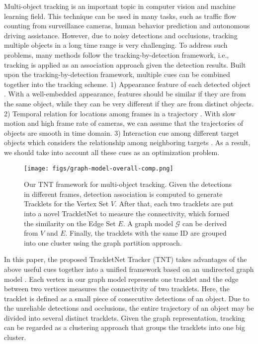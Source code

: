 \documentclass[10pt,twocolumn,letterpaper]{article}
\begin{document}
Multi-object tracking is an important topic in computer vision and machine learning field. This technique can be used in many tasks, such as traffic flow counting from surveillance cameras, human behavior prediction and autonomous driving assistance. 
However, due to noisy detections and occlusions, tracking multiple objects in a long time range is very challenging. To address such problems, many methods follow the tracking-by-detection framework, i.e., tracking is applied as an association approach given the detection results.
Built upon the tracking-by-detection framework, multiple cues can be combined together into the tracking scheme. 1) Appearance feature of each detected object \cite{ristani2018features,zhang2017multi,tang2017multiple,wojke2017simple}. With a well-embedded appearance, features should be similar if they are from the same object, while they can be very different if they are from distinct objects.
2) Temporal relation for locations among frames in a trajectory \cite{milan2017online}. With slow motion and high frame rate of cameras, we can assume that the trajectories of objects 
are smooth in time domain. 
3) Interaction cue among different target objects which considers the relationship among neighboring targets 
\cite{sadeghian2017tracking}. 
As a result, we should take into account all these cues as an optimization problem. 

\begin{figure}[t]
\begin{center}
\texttt{[image: figs/graph-model-overall-comp.png]}
\end{center}
   \caption{Our TNT framework for multi-object tracking. Given the detections in different frames, detection association is computed to generate Tracklets for the Vertex Set $V$. After that, each two tracklets are put into a novel TrackletNet to measure the connectivity, which formed the similarity on the Edge Set $E$. A graph model $\mathcal{G}$ can be derived from $V$ and $E$. Finally, the tracklets with the same ID are grouped into one cluster using the graph partition approach. }
\label{fig:overall-flow}
\end{figure}

In this paper, the proposed TrackletNet Tracker (TNT) takes advantages of the above useful cues together into a unified framework based on an undirected graph model \cite{milan2016multi}. Each vertex in our graph model represents one tracklet and the edge between two vertices measures the connectivity
of two tracklets. Here, the tracklet is defined as a small piece of consecutive detections of an object. Due to the unreliable detections and occlusions, the entire trajectory of an object may be divided into several distinct tracklets.
Given the graph representation, tracking can be regarded as a clustering approach that groups the tracklets into one big cluster. 
\end{document}
